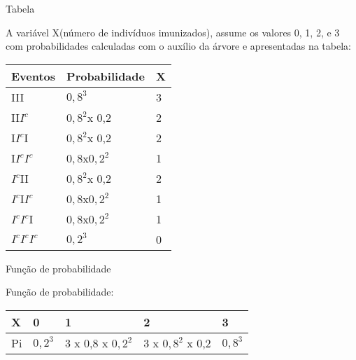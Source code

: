 \documentclass{beamer}
\begin{document}
\begin{frame}{Tabela}

A variável X(número de indivíduos imunizados), assume os valores 0, 1, 2, e 3 com probabilidades calculadas com o auxílio da árvore e apresentadas na tabela:

\begin{table}[]
\centering
\label{tablex}
\begin{tabular}{|l|l|l|}
\hline
Eventos                                                                     & Probabilidade                         & X \\ \hline
III                                                                         & \( 0,8^3 \)           & 3 \\ \hline
II\( I^c \)                                                 & \( 0,8^2 \)x 0,2      & 2 \\ \hline
I\( I^c \)I                                                 & \( 0,8^2 \)x 0,2      & 2 \\ \hline
I\( I^c \)\( I^c \)                         & \( 0,8 \)x\( 0,2^2 \) & 1 \\ \hline
\( I^c \)II                                                 & \( 0,8^2 \)x 0,2      & 2 \\ \hline
\( I^c \)I\( I^c \)                         & \( 0,8 \)x\( 0,2^2 \) & 1 \\ \hline
\( I^c \)\( I^c \)I                         & \( 0,8 \)x\( 0,2^2 \) & 1 \\ \hline
\( I^c \)\( I^c \)\( I^c \) & \( 0,2^3 \)           & 0 \\ \hline
\end{tabular}
\end{table}
\end{frame}

\begin{frame}{Função de probabilidade}

Função de probabilidade:

\begin{table}[]
\centering
\label{funcaoprobabilidade}
\begin{tabular}{l|llll}
X  & 0                         & 1                                   & 2                                       & 3                         \\ \hline
Pi & \(0,2^3\) & 3 x 0,8 x \(0,2^2\) & 3 x \(0,8^2\) x 0,2 & \(0,8^3\)
\end{tabular}
\end{table}
\end{frame}
\end{document}
